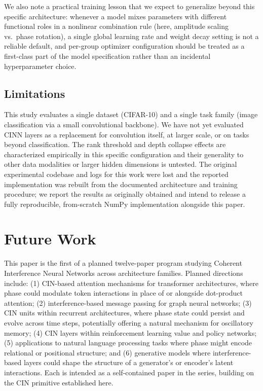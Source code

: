 \documentclass[11pt]{article}
\begin{document}
We also note a practical training lesson that we expect to generalize beyond this specific architecture: whenever a model mixes parameters with different functional roles in a nonlinear combination rule (here, amplitude scaling vs.\ phase rotation), a single global learning rate and weight decay setting is not a reliable default, and per-group optimizer configuration should be treated as a first-class part of the model specification rather than an incidental hyperparameter choice.

\subsection{Limitations}
This study evaluates a single dataset (CIFAR-10) and a single task family (image classification via a small convolutional backbone). We have not yet evaluated CINN layers as a replacement for convolution itself, at larger scale, or on tasks beyond classification. The rank threshold and depth collapse effects are characterized empirically in this specific configuration and their generality to other data modalities or larger hidden dimensions is untested. The original experimental codebase and logs for this work were lost and the reported implementation was rebuilt from the documented architecture and training procedure; we report the results as originally obtained and intend to release a fully reproducible, from-scratch NumPy implementation alongside this paper.

\section{Future Work}
\label{sec:future}

This paper is the first of a planned twelve-paper program studying Coherent Interference Neural Networks across architecture families. Planned directions include: (1) CIN-based attention mechanisms for transformer architectures, where phase could modulate token interactions in place of or alongside dot-product attention; (2) interference-based message passing for graph neural networks; (3) CIN units within recurrent architectures, where phase state could persist and evolve across time steps, potentially offering a natural mechanism for oscillatory memory; (4) CIN layers within reinforcement learning value and policy networks; (5) applications to natural language processing tasks where phase might encode relational or positional structure; and (6) generative models where interference-based layers could shape the structure of a generator's or encoder's latent interactions. Each is intended as a self-contained paper in the series, building on the CIN primitive established here.
\end{document}

